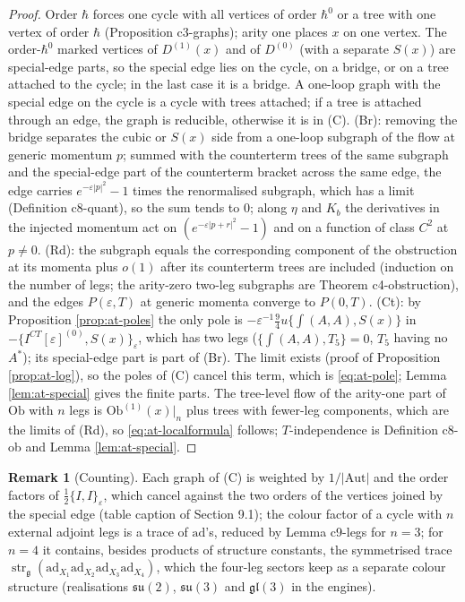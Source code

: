 \documentclass[11pt]{article}
\numberwithin{equation}{section}
\theoremstyle{plain}
\theoremstyle{definition}
\newtheorem{remark}[theorem]{Remark}
\newcommand{\Ob}{\mathrm{Ob}}
\newcommand{\ICT}{I^{CT}[\varepsilon]}
\begin{document}
\begin{proof}
Order $\hbar$ forces one cycle with all vertices of order $\hbar^0$ or a tree with one vertex of order $\hbar$ (Proposition c3-graphs); arity one places $x$ on one vertex. The order-$\hbar^0$ marked vertices of $D^{(1)}(x)$ and of $D^{(0)}$ (with a separate $S(x)$) are special-edge parts, so the special edge lies on the cycle, on a bridge, or on a tree attached to the cycle; in the last case it is a bridge. A one-loop graph with the special edge on the cycle is a cycle with trees attached; if a tree is attached through an edge, the graph is reducible, otherwise it is in (C). (Br): removing the bridge separates the cubic or $S(x)$ side from a one-loop subgraph of the flow at generic momentum $p$; summed with the counterterm trees of the same subgraph and the special-edge part of the counterterm bracket across the same edge, the edge carries $e^{-\varepsilon|p|^2}-1$ times the renormalised subgraph, which has a limit (Definition c8-quant), so the sum tends to $0$; along $\eta$ and $K_b$ the derivatives in the injected momentum act on $(e^{-\varepsilon|p+r|^2}-1)$ and on a function of class $C^2$ at $p\ne0$. (Rd): the subgraph equals the corresponding component of the obstruction at its momenta plus $o(1)$ after its counterterm trees are included (induction on the number of legs; the arity-zero two-leg subgraphs are Theorem c4-obstruction), and the edges $P(\varepsilon,T)$ at generic momenta converge to $P(0,T)$. (Ct): by Proposition \ref{prop:at-poles} the only pole is $-\varepsilon^{-1}\tfrac94u\{\int(A,A),S(x)\}$ in $-\{\ICT^{(0)},S(x)\}_\varepsilon$, which has two legs ($\{\int(A,A),T_5\}=0$, $T_5$ having no $A^*$); its special-edge part is part of (Br). The limit exists (proof of Proposition \ref{prop:at-log}), so the poles of (C) cancel this term, which is \eqref{eq:at-pole}; Lemma \ref{lem:at-special} gives the finite parts. The tree-level flow of the arity-one part of $\Ob$ with $n$ legs is $\Ob^{(1)}(x)|_n$ plus trees with fewer-leg components, which are the limits of (Rd), so \eqref{eq:at-localformula} follows; $T$-independence is Definition c8-ob and Lemma \ref{lem:at-special}.
\end{proof}

\begin{remark}[Counting]
\label{rem:at-counting}
Each graph of (C) is weighted by $1/|\mathrm{Aut}|$ and the order factors of $\tfrac12\{I,I\}_\varepsilon$, which cancel against the two orders of the vertices joined by the special edge (table caption of Section 9.1); the colour factor of a cycle with $n$ external adjoint legs is a trace of $\mathrm{ad}$'s, reduced by Lemma c9-legs for $n=3$; for $n=4$ it contains, besides products of structure constants, the symmetrised trace $\operatorname{str}_{\mathfrak g}(\mathrm{ad}_{X_1}\mathrm{ad}_{X_2}\mathrm{ad}_{X_3}\mathrm{ad}_{X_4})$, which the four-leg sectors keep as a separate colour structure (realisations $\mathfrak{su}(2)$, $\mathfrak{su}(3)$ and $\mathfrak{gl}(3)$ in the engines).
\end{remark}
\end{document}
